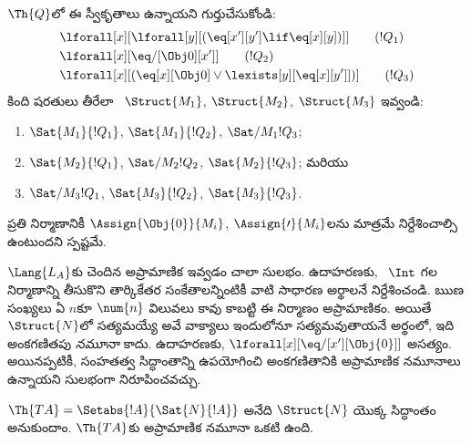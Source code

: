 \documentclass[../../../include/open-logic-section]{subfiles}
\begin{document}
\begin{prob}
$\Th{Q}$లో ఈ స్వీకృతాలు ఉన్నాయని గుర్తుచేసుకోండి:
\begin{align*}
& \lforall[x][\lforall[y][(\eq[x'][y'] \lif \eq[x][y])]] \tag{$!Q_1$}\\
& \lforall[x][\eq/[\Obj 0][x']] \tag{$!Q_2$}\\
& \lforall[x][(\eq[x][\Obj 0] \lor \lexists[y][\eq[x][y']])] \tag{$!Q_3$}
\end{align*}
కింది షరతులు తీరేలా
~$\Struct{M_1}$,
$\Struct{M_2}$, $\Struct{M_3}$ ఇవ్వండి:
\begin{enumerate}
\item $\Sat{M_1}{!Q_1}$, $\Sat{M_1}{!Q_2}$, $\Sat/{M_1}{!Q_3}$;
\item $\Sat{M_2}{!Q_1}$, $\Sat/{M_2}{!Q_2}$, $\Sat{M_2}{!Q_3}$; మరియు
\item $\Sat/{M_3}{!Q_1}$, $\Sat{M_3}{!Q_2}$, $\Sat{M_3}{!Q_3}$.
\end{enumerate}
ప్రతి నిర్మాణానికీ $\Assign{\Obj{0}}{M_i}$, $\Assign{\prime}{M_i}$లను
మాత్రమే నిర్దేశించాల్సి ఉంటుందని స్పష్టమే.
\end{prob}

\begin{explain}
$\Lang{L_A}$కు చెందిన అప్రామాణిక
 ఇవ్వడం చాలా సులభం. ఉదాహరణకు,
~$\Int$ గల నిర్మాణాన్ని తీసుకొని
తార్కికేతర సంకేతాలన్నింటికీ వాటి సాధారణ అర్థాలనే నిర్దేశించండి. ఋణ సంఖ్యలు
ఏ $n$కూ $\num{n}$ విలువలు కావు కాబట్టి ఈ నిర్మాణం అప్రామాణికం.
అయితే $\Struct{N}$లో సత్యమయ్యే అవే వాక్యాలు ఇందులోనూ సత్యమవుతాయనే
అర్థంలో, ఇది అంకగణితపు \emph{నమూనా} కాదు. ఉదాహరణకు,
$\lforall[x][\eq/[x'][\Obj{0}]]$ అసత్యం. అయినప్పటికీ, సంహతత్వ
సిద్ధాంతాన్ని ఉపయోగించి అంకగణితానికి అప్రామాణిక నమూనాలు ఉన్నాయని
సులభంగా నిరూపించవచ్చు.
\end{explain}

\begin{prop}
$\Th{TA}=\Setabs{!A}{\Sat{N}{!A}}$ అనేది $\Struct{N}$ యొక్క
సిద్ధాంతం అనుకుందాం. $\Th{TA}$కు
 అప్రామాణిక నమూనా ఒకటి ఉంది.
\end{prop}
\end{document}
